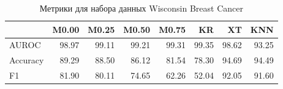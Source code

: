 \begin{table}
\caption{Метрики для набора данных Wisconsin Breast Cancer}
\label{tab:Wisconsin Breast Cancer}
\begin{tabular}{lrrrrrrr}
\toprule
 & M0.00 & M0.25 & M0.50 & M0.75 & KR & XT & KNN \\
\midrule
AUROC & 98.97 & 99.11 & 99.21 & 99.31 & 99.35 & 98.62 & 93.25 \\
Accuracy & 89.29 & 88.50 & 86.12 & 81.54 & 78.30 & 94.69 & 94.49 \\
F1 & 81.90 & 80.11 & 74.65 & 62.26 & 52.04 & 92.05 & 91.60 \\
\bottomrule
\end{tabular}
\end{table}
